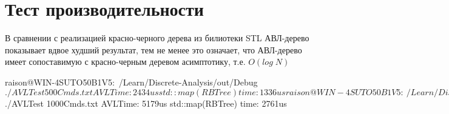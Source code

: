 \section{Тест производительности}
В сравнении с реализацией красно-черного дерева из билиотеки STL АВЛ-дерево показывает вдвое худший результат, тем не менее это означает, что АВЛ-дерево имеет сопоставимую с красно-черным деревом асимптотику, т.е. $O(log\; N)$
\begin{verbatim*}
raison@WIN-4SUTO50B1V5:~/Learn/Discrete-Analysis/out/Debug$ ./AVLTest 500Cmds.txt 
AVLTime: 2434us
std::map(RBTree) time: 1336us
raison@WIN-4SUTO50B1V5:~/Learn/Discrete-Analysis/out/Debug$ ./AVLTest 1000Cmds.txt 
AVLTime: 5179us
std::map(RBTree) time: 2761us
\end{verbatim*}

\pagebreak

